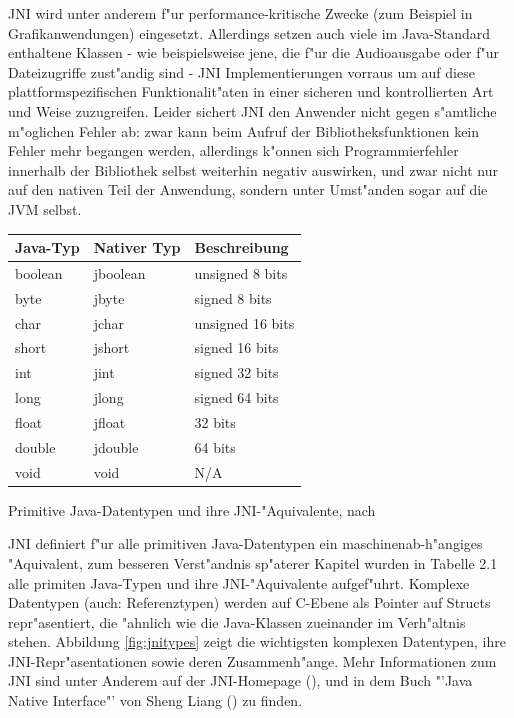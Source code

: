 JNI wird unter anderem f"ur performance-kritische Zwecke (zum Beispiel in Grafikanwendungen) eingesetzt. Allerdings setzen auch viele im Java-Standard enthaltene
Klassen - wie beispielsweise jene, die f"ur die Audioausgabe oder f"ur Dateizugriffe zust"andig sind - JNI Implementierungen vorraus um auf diese
plattformspezifischen Funktionalit"aten in einer sicheren und kontrollierten Art und Weise zuzugreifen. Leider sichert JNI den Anwender nicht gegen s"amtliche m"oglichen
Fehler ab: zwar kann beim Aufruf der Bibliotheksfunktionen kein Fehler mehr begangen werden, allerdings k"onnen sich Programmierfehler innerhalb der
Bibliothek selbst weiterhin negativ auswirken, und zwar nicht nur auf den nativen Teil der Anwendung, sondern unter Umst"anden sogar auf die JVM selbst.

\begin{floatingtable}{
\begin{tabular}[tbh]{|l|l|l|}
\hline
Java-Typ & Nativer Typ & Beschreibung \\
\hline\hline
boolean & jboolean & unsigned 8 bits \\
byte & jbyte & signed 8 bits \\
char & jchar & unsigned 16 bits  \\
short & jshort & signed 16 bits \\
int & jint & signed 32 bits  \\
long & jlong &  signed 64 bits \\
float & jfloat & 32 bits \\
double & jdouble & 64 bits \\
void & void & N/A \\
\hline
\end{tabular}}
\caption{Primitive Java-Datentypen und ihre JNI-"Aquivalente, nach \cite{JNIHP}}
\end{floatingtable}

JNI definiert f"ur alle primitiven Java-Datentypen ein maschinenab-h"angiges "Aquivalent,
zum besseren Verst"andnis sp"aterer Kapitel wurden in Tabelle 2.1 alle primiten Java-Typen und ihre JNI-"Aquivalente
aufgef"uhrt. Komplexe Datentypen (auch: Referenztypen) werden auf C-Ebene als Pointer auf Structs repr"asentiert, die "ahnlich
wie die Java-Klassen zueinander im Verh"altnis stehen.
Abbildung \ref{fig:jnitypes} zeigt die wichtigsten komplexen Datentypen, ihre JNI-Repr"asentationen sowie deren Zusammenh"ange.
Mehr Informationen zum JNI sind unter Anderem auf der JNI-Homepage (\cite{JNIHP}), und in dem Buch "'Java Native Interface"' von Sheng Liang (\cite{JNIBOOK}) zu finden.

